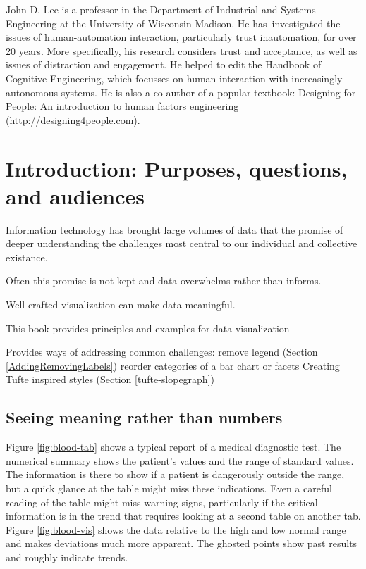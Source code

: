 \documentclass[]{krantz}
\theoremstyle{definition}
\theoremstyle{definition}
\theoremstyle{definition}
\theoremstyle{remark}
\begin{document}
John D. Lee is a professor in the Department of Industrial and Systems
Engineering at the University of Wisconsin-Madison. He has~investigated
the issues of human-automation interaction, particularly trust
inautomation, for over 20 years. More specifically, his research
considers trust and acceptance, as well as issues of distraction and
engagement. He helped to edit the Handbook of Cognitive Engineering,
which focusses on human interaction with increasingly autonomous
systems. He is also a co-author of a popular textbook: Designing for
People: An introduction to human factors engineering
(\url{http://designing4people.com}).

\cleardoublepage 

\chapter{Introduction: Purposes, questions, and
audiences}\label{Introduction}

Information technology has brought large volumes of data that the
promise of deeper understanding the challenges most central to our
individual and collective existance.

Often this promise is not kept and data overwhelms rather than informs.

Well-crafted visualization can make data meaningful.

This book provides principles and examples for data visualization

Provides ways of addressing common challenges: remove legend (Section
\ref{AddingRemovingLabels}) reorder categories of a bar chart or facets
Creating Tufte inspired styles (Section \ref{tufte-slopegraph})

\section{Seeing meaning rather than
numbers}\label{seeing-meaning-rather-than-numbers}

Figure \ref{fig:blood-tab} shows a typical report of a medical
diagnostic test. The numerical summary shows the patient's values and
the range of standard values. The information is there to show if a
patient is dangerously outside the range, but a quick glance at the
table might miss these indications. Even a careful reading of the table
might miss warning signs, particularly if the critical information is in
the trend that requires looking at a second table on another tab. Figure
\ref{fig:blood-vis} shows the data relative to the high and low normal
range and makes deviations much more apparent. The ghosted points show
past results and roughly indicate trends.
\end{document}
